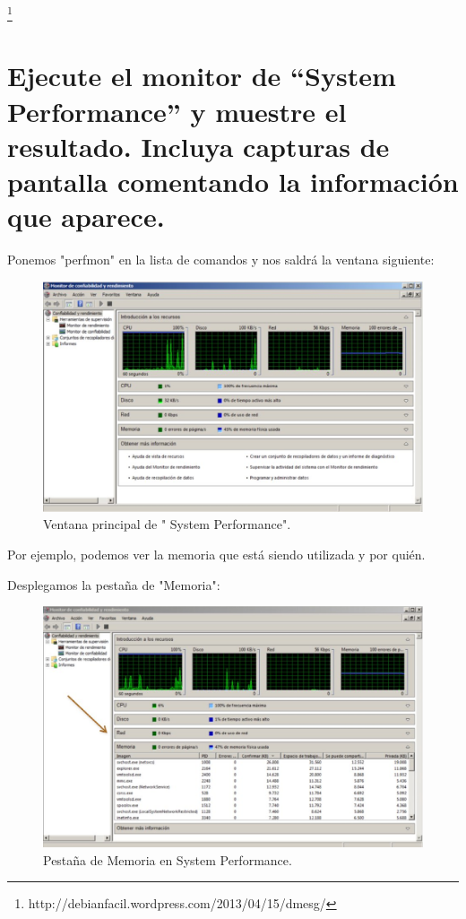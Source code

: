 \footnote{http://debianfacil.wordpress.com/2013/04/15/dmesg/}

\section{ Ejecute el monitor de “System Performance” y muestre el resultado. Incluya capturas de pantalla comentando la información que aparece.}

Ponemos "perfmon" en la lista de comandos y nos saldrá la ventana siguiente:

\begin{figure}[H]
\begin{center}
\includegraphics[scale=0.4]{imagenes/ejercicio4-1.eps}
\caption{Ventana principal de " System Performance".}
\end{center}
\end{figure}

Por ejemplo, podemos ver la memoria que está siendo utilizada y por quién.

Desplegamos la pestaña de "Memoria":


\begin{figure}[H]
\begin{center}
\includegraphics[scale=0.4]{imagenes/ejercicio4-2.eps}
\caption{Pestaña de Memoria en System Performance.}
\end{center}
\end{figure}

